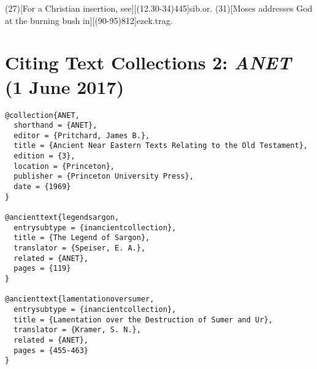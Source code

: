 \documentclass[a4paper]{article}
\renewcommand\footnote[1]{##1}%
\begin{document}
\examplecite(27)[For a Christian insertion, see][(12.30-34)445]{sib.or.}
\examplecite(31)[Moses addresses God at the burning bush in][(90-95)812]{ezek.trag.}
\exampleancientsources
\examplesecondarysources
{}

\section{Citing Text Collections 2: \emph{ANET} (1 June 2017)}

\begin{verbatim}
@collection{ANET,
  shorthand = {ANET},
  editor = {Pritchard, James B.},
  title = {Ancient Near Eastern Texts Relating to the Old Testament},
  edition = {3},
  location = {Princeton},
  publisher = {Princeton University Press},
  date = {1969}
}

@ancienttext{legendsargon,
  entrysubtype = {inancientcollection},
  title = {The Legend of Sargon},
  translator = {Speiser, E. A.},
  related = {ANET},
  pages = {119}
}

@ancienttext{lamentationoversumer,
  entrysubtype = {inancientcollection},
  title = {Lamentation over the Destruction of Sumer and Ur},
  translator = {Kramer, S. N.},
  related = {ANET},
  pages = {455-463}
}
\end{verbatim}
\end{document}
